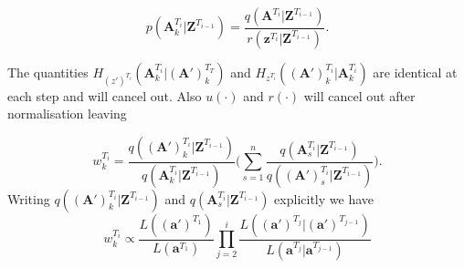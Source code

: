 \documentclass{article}
\renewcommand{\vec}[1]{\mathbf{#1}}
\begin{document}
\begin{equation*}
    p(\vec{A}^{T_i}_k | \vec{Z}^{T_{i-1}}) = \frac{q(\vec{A}^{T_i} | \vec{Z}^{T_{i-1}})}{r(\vec{z}^{T_i}| \vec{Z}^{T_{i-1}})}.
\end{equation*}

The quantities $H_{(z')^{T_i}} (\vec{A}^{T_i}_k | \vec{(A')}^{T_T}_k)$ and $H_{z^{T_i}} (\vec{(A')}^{T_i}_k | \vec{A}^{T_i}_k)$ are identical at each step and will cancel out. Also $u(\cdot)$ and $r(\cdot)$ will cancel out after normalisation leaving

\begin{equation*}
    w^{T_i}_k = \frac{q(\vec{(A')}^{T_i}_k | \vec{Z}^{T_{i-1}})}{q(\vec{A}^{T_i}_k | \vec{Z}^{T_{i-1}})} \Bigg( \sum_{s=1}^n \frac{q(\vec{A}^{T_i}_s | \vec{Z}^{T_{i-1}})}{q(\vec{(A')}^{T_i}_s | \vec{Z}^{T_{i-1}})} \Bigg).
\end{equation*}
Writing $q(\vec{(A')}^{T_i}_k | \vec{Z}^{T_{i-1}})$ and $q(\vec{A}^{T_i}_s | \vec{Z}^{T_{i-1}})$ explicitly we have
\begin{equation*}
    w^{T_i}_k \propto \frac{L((\vec{a}')^{T_1})}{L(\vec{a}^{T_1})} \prod_{j=2}^{i} \frac{L((\vec{a}')^{T_j} | (\vec{a}')^{T_{j-1}})}{L(\vec{a}^{T_j} | \vec{a}^{T_{j-1}})} 
\end{equation*}

\appendix
\end{document}
